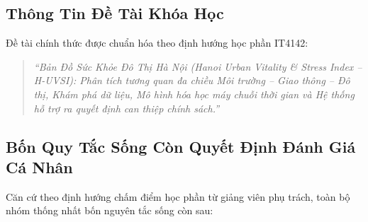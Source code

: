 \documentclass[11pt,a4paper]{article}
\begin{document}
\subsection{Thông Tin Đề Tài Khóa Học}
Đề tài chính thức được chuẩn hóa theo định hướng học phần IT4142:
\begin{quote}
    \textit{“Bản Đồ Sức Khỏe Đô Thị Hà Nội (Hanoi Urban Vitality \& Stress Index -- H-UVSI): Phân tích tương quan đa chiều Môi trường -- Giao thông -- Đô thị, Khám phá dữ liệu, Mô hình hóa học máy chuỗi thời gian và Hệ thống hỗ trợ ra quyết định can thiệp chính sách.”}
\end{quote}

\subsection{Bốn Quy Tắc Sống Còn Quyết Định Đánh Giá Cá Nhân}
Căn cứ theo định hướng chấm điểm học phần từ giảng viên phụ trách, toàn bộ nhóm thống nhất bốn nguyên tắc sống còn sau:
\end{document}
